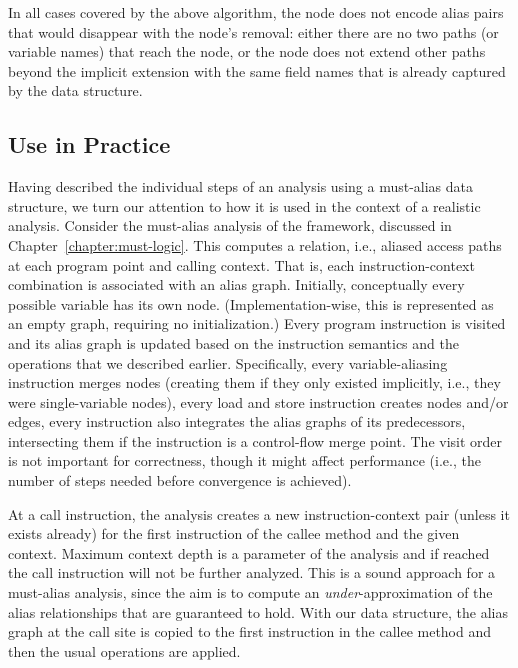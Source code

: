In all cases covered by the above algorithm, the node does not encode alias pairs that would disappear with the node's removal: either there are no two paths (or variable names) that reach the node, or the node does not extend other paths beyond the implicit extension with the same field names that is already captured by the data structure.


\subsection{Use in Practice}

Having described the individual steps of an analysis using a must-alias data structure, we turn our attention to how it is used in the context of a realistic analysis. Consider the must-alias analysis of the \doop{} framework, discussed in Chapter~\ref{chapter:must-logic}. This computes a  relation, i.e., aliased access paths at each program point and calling context. That is, each instruction-context combination is associated with an alias graph. Initially, conceptually every possible variable has its own node. (Implementation-wise, this is represented as an empty graph, requiring no initialization.) Every program instruction is visited and its alias graph is updated based on the instruction semantics and the operations that we described earlier. Specifically, every variable-aliasing instruction merges nodes (creating them if they only existed implicitly, i.e., they were single-variable nodes), every load and store instruction creates nodes and/or edges, every instruction also integrates the alias graphs of its predecessors, intersecting them if the instruction is a control-flow merge point. The visit order is not important for correctness, though it might affect performance (i.e., the number of steps needed before convergence is achieved).

At a call instruction, the analysis creates a new instruction-context pair (unless it exists already) for the first instruction of the callee method and the given context. Maximum context depth is a parameter of the analysis and if reached the call instruction will not be further analyzed. This is a sound approach for a must-alias analysis, since the aim is to compute an \emph{under}-approximation of the alias relationships that are guaranteed to hold. With our data structure, the alias graph at the call site is copied to the first instruction in the callee method and then the usual operations are applied.

